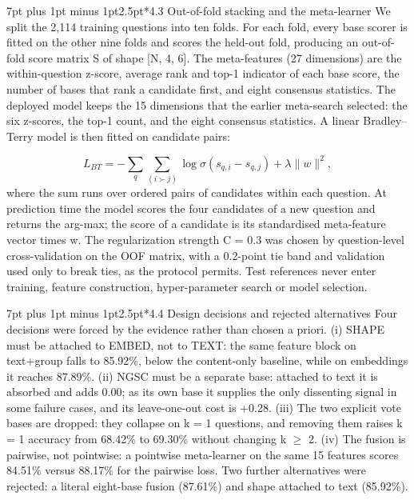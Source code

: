 \documentclass[10pt,a4paper]{article}
\makeatletter
\renewcommand\subsection{\@startsection{subsection}{2}{\z@}%
  {7pt plus 1pt minus 1pt}{2.5pt}{\normalfont\normalsize\bfseries}}
\makeatother
\begin{document}
\subsection*{4.3  Out-of-fold stacking and the meta-learner}
We split the 2,114 training questions into ten folds. For each fold, every base scorer is fitted on the other nine folds and scores the held-out fold, producing an out-of-fold score matrix S of shape [N, 4, 6]. The meta-features (27 dimensions) are the within-question z-score, average rank and top-1 indicator of each base score, the number of bases that rank a candidate first, and eight consensus statistics. The deployed model keeps the 15 dimensions that the earlier meta-search selected: the six z-scores, the top-1 count, and the eight consensus statistics. A linear Bradley--Terry model is then fitted on candidate pairs:

\[ L_{BT} = -\sum_{q}\sum_{(i\succ j)} \log \sigma\left(s_{q,i}-s_{q,j}\right) + \lambda\|w\|^{2}, \]
where the sum runs over ordered pairs of candidates within each question. At prediction time the model scores the four candidates of a new question and returns the arg-max; the score of a candidate is its standardised meta-feature vector times w. The regularization strength C = 0.3 was chosen by question-level cross-validation on the OOF matrix, with a 0.2-point tie band and validation used only to break ties, as the protocol permits. Test references never enter training, feature construction, hyper-parameter search or model selection.

\subsection*{4.4  Design decisions and rejected alternatives}
Four decisions were forced by the evidence rather than chosen a priori. (i) SHAPE must be attached to EMBED, not to TEXT: the same feature block on text+group falls to 85.92\%, below the content-only baseline, while on embeddings it reaches 87.89\%. (ii) NGSC must be a separate base: attached to text it is absorbed and adds 0.00; as its own base it supplies the only dissenting signal in some failure cases, and its leave-one-out cost is +0.28. (iii) The two explicit vote bases are dropped: they collapse on k = 1 questions, and removing them raises k = 1 accuracy from 68.42\% to 69.30\% without changing k $\geq$ 2. (iv) The fusion is pairwise, not pointwise: a pointwise meta-learner on the same 15 features scores 84.51\% versus 88.17\% for the pairwise loss. Two further alternatives were rejected: a literal eight-base fusion (87.61\%) and shape attached to text (85.92\%).
\end{document}
